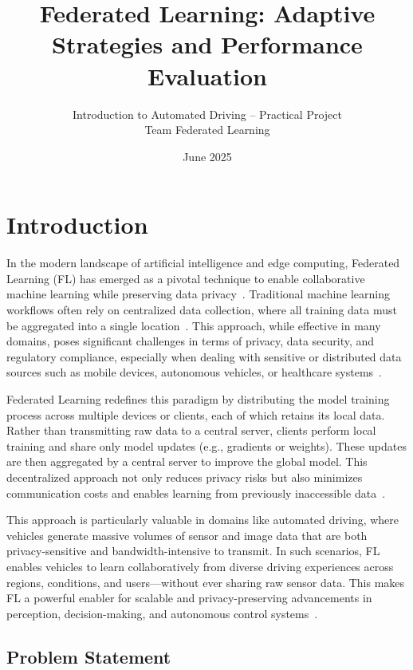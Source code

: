 \documentclass[11pt]{article}
\title{\textbf{Federated Learning: Adaptive Strategies and Performance Evaluation}}
\author{Introduction to Automated Driving -- Practical Project\\Team Federated Learning}
\date{June 2025}
\begin{document}
    \maketitle

    \section{Introduction}

    In the modern landscape of artificial intelligence and edge computing, Federated Learning (FL) has emerged as a pivotal technique to enable collaborative machine learning while preserving data privacy~\cite{rahman2021challenges}. Traditional machine learning workflows often rely on centralized data collection, where all training data must be aggregated into a single location~\cite{mcmahan2017communication}. This approach, while effective in many domains, poses significant challenges in terms of privacy, data security, and regulatory compliance, especially when dealing with sensitive or distributed data sources such as mobile devices, autonomous vehicles, or healthcare systems~\cite{chai2024survey}.

    Federated Learning redefines this paradigm by distributing the model training process across multiple devices or clients, each of which retains its local data. Rather than transmitting raw data to a central server, clients perform local training and share only model updates (e.g., gradients or weights). These updates are then aggregated by a central server to improve the global model. This decentralized approach not only reduces privacy risks but also minimizes communication costs and enables learning from previously inaccessible data~\cite{mcmahan2017communication}.

    This approach is particularly valuable in domains like automated driving, where vehicles generate massive volumes of sensor and image data that are both privacy-sensitive and bandwidth-intensive to transmit. In such scenarios, FL enables vehicles to learn collaboratively from diverse driving experiences across regions, conditions, and users—without ever sharing raw sensor data. This makes FL a powerful enabler for scalable and privacy-preserving advancements in perception, decision-making, and autonomous control systems~\cite{rahman2021challenges}.

    \subsection{Problem Statement}
\end{document}
